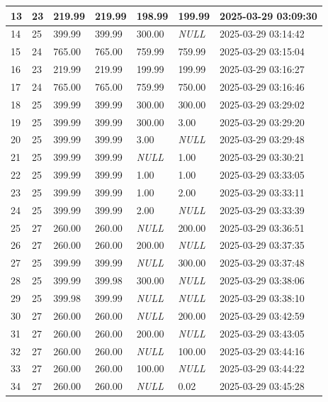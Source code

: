 \begin{longtable}{|l|l|l|l|l|l|l|}
13 & 23 & 219.99 & 219.99 & 198.99 & 199.99 & 2025-03-29 03:09:30 \\ \hline 
14 & 25 & 399.99 & 399.99 & 300.00 & \textit{NULL} & 2025-03-29 03:14:42 \\ \hline 
15 & 24 & 765.00 & 765.00 & 759.99 & 759.99 & 2025-03-29 03:15:04 \\ \hline 
16 & 23 & 219.99 & 219.99 & 199.99 & 199.99 & 2025-03-29 03:16:27 \\ \hline 
17 & 24 & 765.00 & 765.00 & 759.99 & 750.00 & 2025-03-29 03:16:46 \\ \hline 
18 & 25 & 399.99 & 399.99 & 300.00 & 300.00 & 2025-03-29 03:29:02 \\ \hline 
19 & 25 & 399.99 & 399.99 & 300.00 & 3.00 & 2025-03-29 03:29:20 \\ \hline 
20 & 25 & 399.99 & 399.99 & 3.00 & \textit{NULL} & 2025-03-29 03:29:48 \\ \hline 
21 & 25 & 399.99 & 399.99 & \textit{NULL} & 1.00 & 2025-03-29 03:30:21 \\ \hline 
22 & 25 & 399.99 & 399.99 & 1.00 & 1.00 & 2025-03-29 03:33:05 \\ \hline 
23 & 25 & 399.99 & 399.99 & 1.00 & 2.00 & 2025-03-29 03:33:11 \\ \hline 
24 & 25 & 399.99 & 399.99 & 2.00 & \textit{NULL} & 2025-03-29 03:33:39 \\ \hline 
25 & 27 & 260.00 & 260.00 & \textit{NULL} & 200.00 & 2025-03-29 03:36:51 \\ \hline 
26 & 27 & 260.00 & 260.00 & 200.00 & \textit{NULL} & 2025-03-29 03:37:35 \\ \hline 
27 & 25 & 399.99 & 399.99 & \textit{NULL} & 300.00 & 2025-03-29 03:37:48 \\ \hline 
28 & 25 & 399.99 & 399.98 & 300.00 & \textit{NULL} & 2025-03-29 03:38:06 \\ \hline 
29 & 25 & 399.98 & 399.99 & \textit{NULL} & \textit{NULL} & 2025-03-29 03:38:10 \\ \hline 
30 & 27 & 260.00 & 260.00 & \textit{NULL} & 200.00 & 2025-03-29 03:42:59 \\ \hline 
31 & 27 & 260.00 & 260.00 & 200.00 & \textit{NULL} & 2025-03-29 03:43:05 \\ \hline 
32 & 27 & 260.00 & 260.00 & \textit{NULL} & 100.00 & 2025-03-29 03:44:16 \\ \hline 
33 & 27 & 260.00 & 260.00 & 100.00 & \textit{NULL} & 2025-03-29 03:44:22 \\ \hline 
34 & 27 & 260.00 & 260.00 & \textit{NULL} & 0.02 & 2025-03-29 03:45:28 \\ \hline 

\end{longtable}
